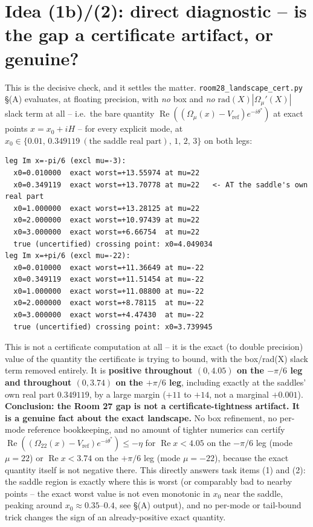 \documentclass[11pt]{article}
\begin{document}
\section{Idea (1b)/(2): direct diagnostic -- is the gap a certificate artifact, or genuine?}
This is the decisive check, and it settles the matter. \texttt{room28\_landscape\_cert.py} \S(A) evaluates,
at floating precision, with \emph{no} box and \emph{no} $\mathrm{rad}(X)|\Omega_\mu'(X)|$ slack term at all
-- i.e.\ the bare quantity $\operatorname{Re}((\Omega_\mu(x)-V_{\mathrm{ref}})e^{-i\theta^\ast})$ at exact
points $x=x_0+iH$ -- for every explicit mode, at $x_0\in\{0.01,\,0.349119\ (\text{the saddle real part}),\,
1,\,2,\,3\}$ on both legs:
\begin{verbatim}
leg Im x=-pi/6 (excl mu=-3):
  x0=0.010000  exact worst=+13.55974 at mu=22
  x0=0.349119  exact worst=+13.70778 at mu=22   <- AT the saddle's own real part
  x0=1.000000  exact worst=+13.28125 at mu=22
  x0=2.000000  exact worst=+10.97439 at mu=22
  x0=3.000000  exact worst=+6.66754  at mu=22
  true (uncertified) crossing point: x0=4.049034
leg Im x=+pi/6 (excl mu=-22):
  x0=0.010000  exact worst=+11.36649 at mu=-22
  x0=0.349119  exact worst=+11.51454 at mu=-22
  x0=1.000000  exact worst=+11.08800 at mu=-22
  x0=2.000000  exact worst=+8.78115  at mu=-22
  x0=3.000000  exact worst=+4.47430  at mu=-22
  true (uncertified) crossing point: x0=3.739945
\end{verbatim}
This is not a certificate computation at all -- it is the exact (to double precision) value of the
quantity the certificate is trying to bound, with the box/rad(X) slack term removed entirely. It is
\textbf{positive throughout $(0,4.05)$ on the $-\pi/6$ leg and throughout $(0,3.74)$ on the $+\pi/6$ leg},
including exactly at the saddles' own real part $0.349119$, by a large margin ($+11$ to $+14$, not a
marginal $+0.001$). \textbf{Conclusion: the Room 27 gap is not a certificate-tightness artifact. It is a
genuine fact about the exact landscape.} No box refinement, no per-mode reference bookkeeping, and no
amount of tighter numerics can certify $\operatorname{Re}((\Omega_{22}(x)-V_{\mathrm{ref}})e^{-i\theta^\ast})
\le-\eta$ for $\operatorname{Re}x<4.05$ on the $-\pi/6$ leg (mode $\mu=22$) or $\operatorname{Re}x<3.74$ on
the $+\pi/6$ leg (mode $\mu=-22$), because the exact quantity itself is not negative there. This directly
answers task items (1) and (2): the saddle region is exactly where this is worst (or comparably bad to
nearby points -- the exact worst value is not even monotonic in $x_0$ near the saddle, peaking around
$x_0\approx0.35$--$0.4$, see \S(A) output), and no per-mode or tail-bound trick changes the sign of an
already-positive exact quantity.
\end{document}
